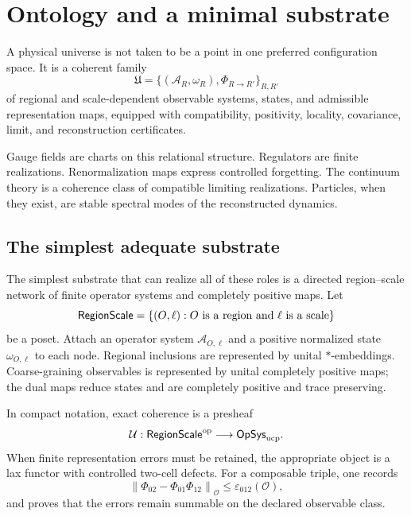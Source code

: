 \section{Ontology and a minimal substrate}

A physical universe is not taken to be a point in one preferred
configuration space.  It is a coherent family
\begin{equation}
 \mathfrak U=\bigl\{(\mathcal A_R,\omega_R),
 \Phi_{R\to R'}\bigr\}_{R,R'}
\end{equation}
of regional and scale-dependent observable systems, states, and admissible
representation maps, equipped with compatibility, positivity, locality,
covariance, limit, and reconstruction certificates.

Gauge fields are charts on this relational structure.  Regulators are finite
realizations.  Renormalization maps express controlled forgetting.  The
continuum theory is a coherence class of compatible limiting realizations.
Particles, when they exist, are stable spectral modes of the reconstructed
dynamics.

\subsection{The simplest adequate substrate}

The simplest substrate that can realize all of these roles is a directed
region--scale network of finite operator systems and completely positive
maps.  Let
\begin{equation}
 \mathsf{RegionScale}=\{(O,\ell): O\text{ is a region and }\ell\text{ is a scale}\}
\end{equation}
be a poset.  Attach an operator system \(\mathcal A_{O,\ell}\) and a positive
normalized state \(\omega_{O,\ell}\) to each node.  Regional inclusions are
represented by unital \(*\)-embeddings.  Coarse-graining observables is
represented by unital completely positive maps; the dual maps reduce states
and are completely positive and trace preserving.

In compact notation, exact coherence is a presheaf
\begin{equation}
 \mathcal U:\mathsf{RegionScale}^{\mathrm{op}}\longrightarrow\mathsf{OpSys}_{\mathrm{ucp}}.
\end{equation}
When finite representation errors must be retained, the appropriate object
is a lax functor with controlled two-cell defects.  For a composable triple,
one records
\begin{equation}
 \left\|\Phi_{02}-\Phi_{01}\Phi_{12}\right\|_{\mathcal O}
 \le \varepsilon_{012}(\mathcal O),
\end{equation}
and proves that the errors remain summable on the declared observable class.

